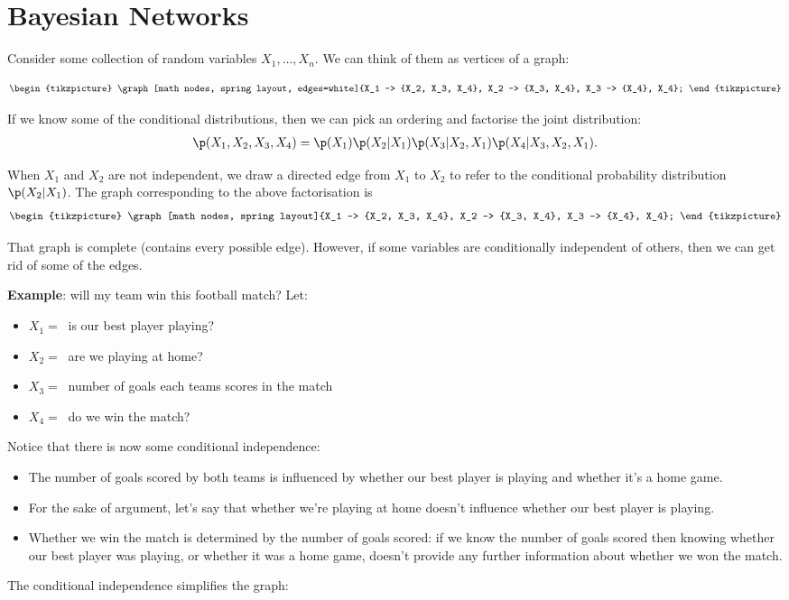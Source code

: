 \section{Bayesian Networks}


Consider some collection of random variables $X_1, \ldots, X_n$. We can think of them as vertices of a graph:

\begin{align*}
\begin{tikzpicture}
  \graph[math nodes, spring layout, edges=white]{X_1 -> {X_2, X_3, X_4}, X_2 -> {X_3, X_4}, X_3 -> {X_4}, X_4};
\end{tikzpicture}
\end{align*}


If we know some of the conditional distributions, then we can pick an ordering and factorise the joint
distribution:
\begin{align*}
  \p(X_1, X_2, X_3, X_4) = \p(X_1) \p(X_2|X_1) \p(X_3|X_2, X_1) \p(X_4|X_3, X_2, X_1).
\end{align*}

When $X_1$ and $X_2$ are not independent, we draw a directed edge from $X_1$ to $X_2$ to refer to the conditional probability distribution $\p(X_2|X_1)$. The graph corresponding to the above factorisation is
\begin{align*}
\begin{tikzpicture}
  \graph[math nodes, spring layout]{X_1 -> {X_2, X_3, X_4}, X_2 -> {X_3, X_4}, X_3 -> {X_4}, X_4};
\end{tikzpicture}
\end{align*}

That graph is complete (contains every possible edge). However, if some variables are conditionally independent of others, then we can get rid of some of the edges.

{\bf Example}: will my team win this football match?
Let:
\begin{itemize}[label=$\circ$]
\item $X_1 = ~$ is our best player playing?
\item $X_2 = ~$ are we playing at home?
\item $X_3 = ~$ number of goals each teams scores in the match
\item $X_4 = ~$ do we win the match?
\end{itemize}

Notice that there is now some conditional independence:
\begin{itemize}
\item The number of goals scored by both teams is influenced by whether our best player is playing and whether it's a home game.
\item For the sake of argument, let's say that whether we're playing at home doesn't influence whether our best player is playing.
\item Whether we win the match is determined by the number of goals scored: if we know the number of goals scored then knowing whether our best player was playing, or whether it was a home game, doesn't provide any further information about whether we won the match.
\end{itemize}
The conditional independence simplifies the graph:


